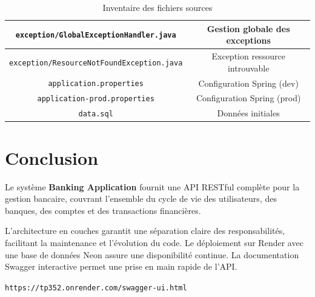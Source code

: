 \documentclass[12pt,a4paper]{article}
\begin{document}
\begin{table}[H]
\begin{tabular}{|c|c|}
        \hline
        \texttt{exception/GlobalExceptionHandler.java} & Gestion globale des exceptions \\
        \hline
        \texttt{exception/ResourceNotFoundException.java} & Exception ressource introuvable \\
        \hline
        \texttt{application.properties} & Configuration Spring (dev) \\
        \hline
        \texttt{application-prod.properties} & Configuration Spring (prod) \\
        \hline
        \texttt{data.sql} & Données initiales \\
        \hline
    \end{tabular}
    \caption{Inventaire des fichiers sources}
\end{table}

\section{Conclusion}

Le système \textbf{Banking Application} fournit une API RESTful complète pour la gestion bancaire, couvrant l'ensemble du cycle de vie des utilisateurs, des banques, des comptes et des transactions financières.

L'architecture en couches garantit une séparation claire des responsabilités, facilitant la maintenance et l'évolution du code. Le déploiement sur Render avec une base de données Neon assure une disponibilité continue. La documentation Swagger interactive permet une prise en main rapide de l'API.

\vspace{0.8cm}
\begin{center}
    \textcolor{secondary}{\large\texttt{https://tp352.onrender.com/swagger-ui.html}}
\end{center}
\end{document}
